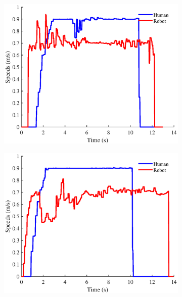 \begin{figure}[h!]
\centering
\hspace{-0.15cm}
\begin{subfigure}{.5\columnwidth}
  \includegraphics[width=\textwidth]{images/chapter6/smb/cross_vel.eps}
\end{subfigure}
\hspace{-0.75cm}
\begin{subfigure}{.5\columnwidth}
  \includegraphics[width=\textwidth]{images/chapter6/cohan/cross_vel.eps}
\end{subfigure}

\end{figure}

